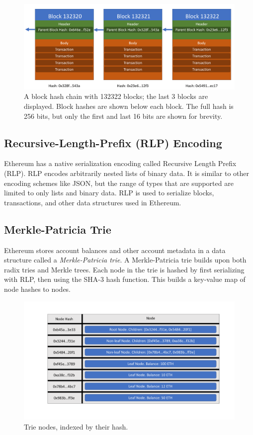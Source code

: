 \documentclass[12pt]{article}
\begin{document}
\begin{figure}[H]
  \centering
  \includegraphics[width=\textwidth]{../figures/background/blocks/blocks.pdf}
  \caption{A block hash chain with 132322 blocks; the last 3 blocks are displayed. Block hashes are shown below each block. The full hash is 256 bits, but only the first and last 16 bits are shown for brevity.}
\end{figure}


\subsection{Recursive-Length-Prefix (RLP) Encoding} \label{subsection:rlp}

Ethereum has a native serialization encoding called Recursive Length Prefix (RLP). RLP encodes arbitrarily nested lists of binary data. It is similar to other encoding schemes like JSON, but the range of types that are supported are limited to only lists and binary data. RLP is used to serialize blocks, transactions, and other data structures used in Ethereum.

\subsection{Merkle-Patricia Trie} \label{subsection:merklepatriciatrie}

Ethereum stores account balances and other account metadata in a data structure called a \emph{Merkle-Patricia trie}. A Merkle-Patricia trie builds upon both radix tries and Merkle trees. Each node in the trie is hashed by first serializing with RLP, then using the SHA-3 hash function. This builds a key-value map of node hashes to nodes.

\begin{figure}[H]
  \centering
  \includegraphics[width=\textwidth]{../figures/background/trie/tree_nodes.pdf}
  \caption{Trie nodes, indexed by their hash.} \label{fig:trienodes}
\end{figure}
\end{document}
